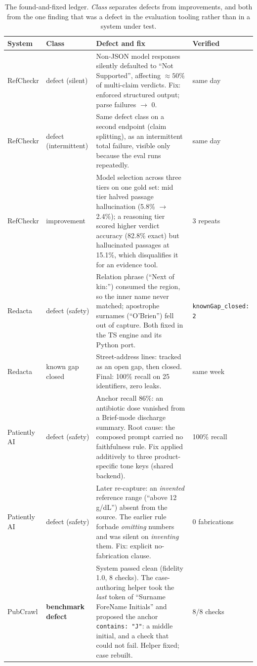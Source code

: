 \documentclass[11pt,a4paper]{article}
\begin{document}
\begin{table}[t]
\centering
\footnotesize
\begin{tabularx}{\textwidth}{l L{2.6cm} X l}
\toprule
\textbf{System} & \textbf{Class} & \textbf{Defect and fix} & \textbf{Verified}\\
\midrule
RefCheckr & defect (silent) &
Non-JSON model responses silently defaulted to ``Not Supported'', affecting ${\approx}50\%$ of
multi-claim verdicts. Fix: enforced structured output; parse failures $\rightarrow$ 0. &
same day\\
RefCheckr & defect (intermittent) &
Same defect class on a second endpoint (claim splitting), as an intermittent total failure, visible
only because the eval runs repeatedly. &
same day\\
RefCheckr & improvement &
Model selection across three tiers on one gold set: mid tier halved passage hallucination
(5.8\% $\rightarrow$ 2.4\%); a reasoning tier scored higher verdict accuracy (82.8\% exact) but
hallucinated passages at 15.1\%, which disqualifies it for an evidence tool. &
3 repeats\\
Redacta & defect (safety) &
Relation phrase (``Next of kin:'') consumed the region, so the inner name never matched;
apostrophe surnames (``O'Brien'') fell out of capture. Both fixed in the TS engine and its Python
port. &
\texttt{knownGap\_closed: 2}\\
Redacta & known gap closed &
Street-address lines: tracked as an open gap, then closed. Final: 100\% recall on 25 identifiers,
zero leaks. &
same week\\
Patiently AI & defect (safety) &
Anchor recall 86\%: an antibiotic dose vanished from a Brief-mode discharge summary. Root cause: the
composed prompt carried no faithfulness rule. Fix applied additively to three product-specific tone
keys (shared backend). &
100\% recall\\
Patiently AI & defect (safety) &
Later re-capture: an \emph{invented} reference range (``above 12 g/dL'') absent from the source. The
earlier rule forbade \emph{omitting} numbers and was silent on \emph{inventing} them. Fix: explicit
no-fabrication clause. &
0 fabrications\\
PubCrawl & \textbf{benchmark defect} &
System passed clean (fidelity 1.0, 8 checks). The case-authoring helper took the \emph{last} token of
``Surname ForeName Initials'' and proposed the anchor \texttt{contains:\,"J"}: a middle initial, and
a check that could not fail. Helper fixed; case rebuilt. &
8/8 checks\\
\bottomrule
\end{tabularx}
\caption{The found-and-fixed ledger. \emph{Class} separates defects from improvements, and both from
the one finding that was a defect in the evaluation tooling rather than in a system under test.}
\label{tab:ledger}
\end{table}
\end{document}
